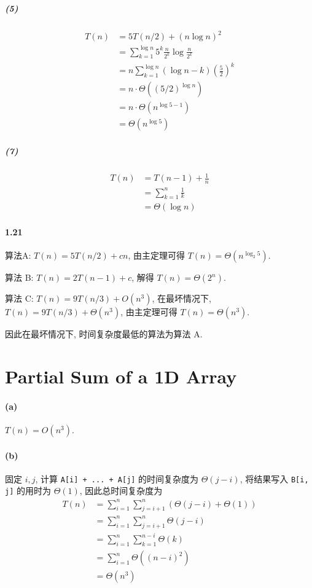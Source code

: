 \documentclass{ctexart}
\begin{document}
\subparagraph*{(5)} \begin{align*}
    T(n) & = 5T(n/2) + (n\log n)^2                                      \\
         & = \sum_{k=1}^{\log n} 5^k \frac{n}{2^k} \log \frac{n}{2^k}   \\
         & = n \sum_{k=1}^{\log n} (\log n-k)\left(\frac{5}{2}\right)^k \\
         & = n \cdot \Theta\left((5/2)^{\log n}\right)                  \\
         & = n \cdot \Theta\left(n^{\log 5-1}\right)                    \\
         & = \Theta(n^{\log 5})
\end{align*}

\subparagraph*{(7)} \begin{align*}
    T(n) & = T(n-1) + \frac{1}{n}     \\
         & = \sum_{k=1}^n \frac{1}{k} \\
         & = \Theta(\log n)
\end{align*}

\paragraph*{1.21} 算法A: $T(n)=5T(n/2) + cn$, 由主定理可得 $T(n)=\Theta(n^{\log_2 5})$.

算法 B: $T(n)=2T(n-1) + c$, 解得 $T(n)=\Theta(2^n)$.

算法 C: $T(n)=9T(n/3) + O(n^3)$, 在最坏情况下, $T(n)=9T(n/3) + \Theta(n^3)$, 由主定理可得 $T(n)=\Theta(n^3)$.

因此在最坏情况下, 时间复杂度最低的算法为算法 A.

\newpage
\section{Partial Sum of a 1D Array}

\paragraph*{(a)} $T(n)=O(n^3)$.

\paragraph*{(b)} 固定 $i, j$, 计算 \texttt{A[i] + ... + A[j]} 的时间复杂度为 $\Theta(j-i)$, 将结果写入 \texttt{B[i, j]} 的用时为 $\Theta(1)$, 因此总时间复杂度为
\begin{align*}
    T(n) & = \sum_{i=1}^n \sum_{j=i+1}^n \left(\Theta(j-i) + \Theta(1)\right) \\
         & = \sum_{i=1}^n \sum_{j=i+1}^n \Theta(j-i)                          \\
         & = \sum_{i=1}^n \sum_{k=1}^{n-i} \Theta(k)                          \\
         & = \sum_{i=1}^n \Theta((n-i)^2)                                     \\
         & = \Theta(n^3)
\end{align*}
\end{document}
